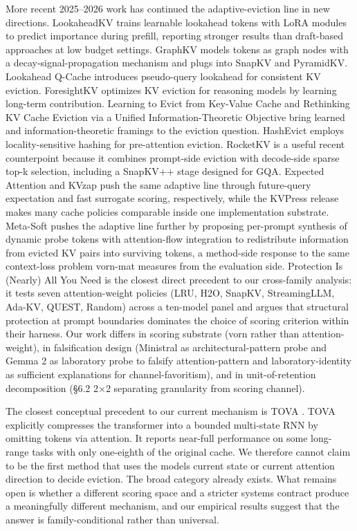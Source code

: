 \documentclass[
]{article}
\begin{document}
More recent 2025--2026 work has continued the adaptive-eviction line in
new directions. LookaheadKV \citep{lookahead2026kv}
trains learnable lookahead tokens with LoRA modules to predict
importance during prefill, reporting stronger results than draft-based
approaches at low budget settings. GraphKV
\citep{graphkv2025} models tokens as graph nodes with a
decay-signal-propagation mechanism and plugs into SnapKV and PyramidKV.
Lookahead Q-Cache \citep{lookaheadqcache2025} introduces
pseudo-query lookahead for consistent KV eviction. ForesightKV
\citep{foresightkv2026} optimizes KV eviction for
reasoning models by learning long-term contribution. Learning to Evict
from Key-Value Cache \citep{learntoevict2026} and
Rethinking KV Cache Eviction via a Unified Information-Theoretic
Objective \citep{unifiedinfo2026} bring learned and
information-theoretic framings to the eviction question. HashEvict
\citep{hashevict2024} employs locality-sensitive hashing
for pre-attention eviction. RocketKV
\citep{behnam2025rocketkv} is a useful recent
counterpoint because it combines prompt-side eviction with decode-side
sparse top-k selection, including a SnapKV++ stage designed for GQA.
Expected Attention \citep{devoto2025expectedattention}
and KVzap \citep{jegou2026kvzap} push the same adaptive
line through future-query expectation and fast surrogate scoring,
respectively, while the KVPress release makes many cache policies
comparable inside one implementation substrate. Meta-Soft
\citep{luo2026metasoft} pushes the adaptive line further by proposing
per-prompt synthesis of dynamic probe tokens with attention-flow
integration to redistribute information from evicted KV pairs into
surviving tokens, a method-side response to the same context-loss
problem vorn-mat measures from the evaluation side. Protection Is (Nearly)
All You Need \citep{garcia2026protection} is the closest
direct precedent to our cross-family analysis: it tests seven
attention-weight policies (LRU, H2O, SnapKV, StreamingLLM, Ada-KV,
QUEST, Random) across a ten-model panel and argues that structural
protection at prompt boundaries dominates the choice of scoring
criterion within their harness. Our work differs in scoring substrate
(vorn rather than attention-weight), in falsification
design (Ministral as architectural-pattern probe and Gemma 2 as
laboratory probe to falsify attention-pattern and laboratory-identity
as sufficient explanations for channel-favoritism), and in
unit-of-retention decomposition (§6.2 2×2 separating granularity from
scoring channel).

The closest conceptual precedent to our current mechanism is TOVA \citep{oren2024tova}. TOVA explicitly compresses the transformer into a bounded
multi-state RNN by omitting tokens via attention. It reports near-full
performance on some long-range tasks with only one-eighth of the
original cache. We therefore cannot claim to be the first method that
uses the model\textquotesingle s current state or current attention
direction to decide eviction. The broad category already exists. What
remains open is whether a different scoring space and a stricter systems
contract produce a meaningfully different mechanism, and our empirical
results suggest that the answer is family-conditional rather than
universal.
\end{document}
